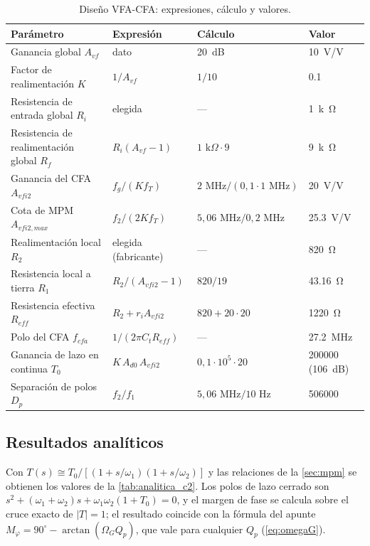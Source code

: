 \begin{table}[H]
\centering
\caption{Diseño VFA-CFA: expresiones, cálculo y valores.}
\label{tab:parametros_vfa_cfa}
\footnotesize
\setlength{\tabcolsep}{4pt}
\begin{tabular}{>{\raggedright\arraybackslash}p{} >{\centering\arraybackslash}p{} >{\centering\arraybackslash}p{} >{\centering\arraybackslash}p{}}
\toprule
\textbf{Parámetro} & \textbf{Expresión} & \textbf{Cálculo} & \textbf{Valor} \\
\midrule
Ganancia global $A_{vf}$ & dato & \SI{20}{dB} & \SI{10}{V/V} \\
Factor de realimentación $K$ & $1/A_{vf}$ & $1/10$ & \num{0,1} \\
Resistencia de entrada global $R_i$ & elegida & --- & \SI{1}{k\ohm} \\
Resistencia de realimentación global $R_f$ & $R_i(A_{vf}-1)$ & $1\text{ k}\Omega\cdot 9$ & \SI{9}{k\ohm} \\
Ganancia del CFA $A_{vfi2}$ & $f_g/(K f_T)$ & $2\text{ MHz}/(0{,}1\cdot 1\text{ MHz})$ & \SI{20}{V/V} \\
Cota de MPM $A_{vfi2,max}$ & $f_2/(2Kf_T)$ & $5{,}06\text{ MHz}/0{,}2\text{ MHz}$ & \SI{25,3}{V/V} \\
Realimentación local $R_2$ & elegida (fabricante) & --- & \SI{820}{\ohm} \\
Resistencia local a tierra $R_1$ & $R_2/(A_{vfi2}-1)$ & $820/19$ & \SI{43,16}{\ohm} \\
Resistencia efectiva $R_{eff}$ & $R_2 + r_iA_{vfi2}$ & $820 + 20\cdot 20$ & \SI{1220}{\ohm} \\
Polo del CFA $f_{cfa}$ & $1/(2\pi C_tR_{eff})$ & --- & \SI{27,2}{MHz} \\
Ganancia de lazo en continua $T_0$ & $K\,A_{d0}\,A_{vfi2}$ & $0{,}1\cdot 10^5\cdot 20$ & \num{200000} (\SI{106}{dB}) \\
Separación de polos $D_p$ & $f_2/f_1$ & $5{,}06\text{ MHz}/10\text{ Hz}$ & \num{506000} \\
\bottomrule
\end{tabular}
\end{table}

\subsection{Resultados analíticos}
\label{sec:analitico_c2}

Con $T(s)\cong T_0/[(1+s/\omega_1)(1+s/\omega_2)]$ y las relaciones de la \autoref{sec:mpm} se obtienen los valores de la \autoref{tab:analitica_c2}. Los polos de lazo cerrado son $s^2 + (\omega_1+\omega_2)s + \omega_1\omega_2(1+T_0) = 0$, y el margen de fase se calcula sobre el cruce exacto de $|T|=1$; el resultado coincide con la fórmula del apunte $M_\varphi = 90^\circ - \arctan(\Omega_GQ_p)$, que vale para cualquier $Q_p$ (\autoref{eq:omegaG}).

